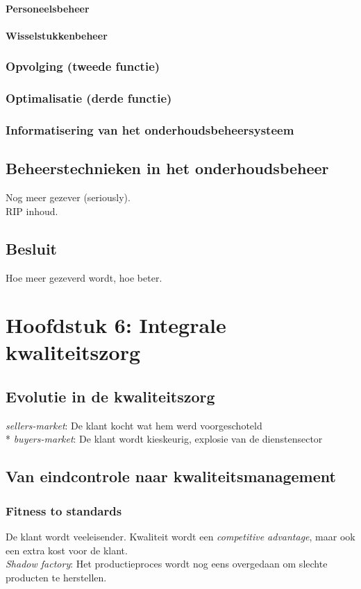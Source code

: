 \documentclass[12pt]{article}
\begin{document}
\paragraph{Personeelsbeheer}
\paragraph{Wisselstukkenbeheer}
\subsubsection{Opvolging (tweede functie)}
\subsubsection{Optimalisatie (derde functie)}
\subsubsection{Informatisering van het onderhoudsbeheersysteem}
\subsection{Beheerstechnieken in het onderhoudsbeheer}
Nog meer gezever (seriously).\\
RIP inhoud.
\subsection{Besluit}
Hoe meer gezeverd wordt, hoe beter.
\clearpage
\section{Hoofdstuk 6: Integrale kwaliteitszorg}
\subsection{Evolutie in de kwaliteitszorg}
\textit{sellers-market}: De klant kocht wat hem werd voorgeschoteld\\*
\textit{buyers-market}: De klant wordt kieskeurig, explosie van de dienstensector
\subsection{Van eindcontrole naar kwaliteitsmanagement}
\subsubsection{Fitness to standards}
De klant wordt veeleisender. Kwaliteit wordt een \textit{competitive advantage}, maar ook een extra kost voor de klant.\\
\textit{Shadow factory}: Het productieproces wordt nog eens overgedaan om slechte producten te herstellen.
\end{document}
